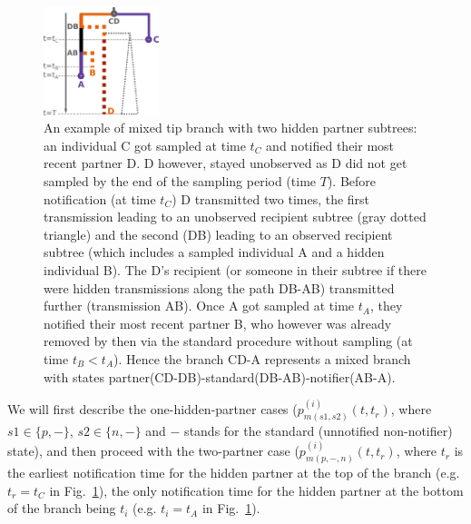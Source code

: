 \documentclass[a4paper,10pt]{article}
\begin{document}
\begin{figure}[tbhp]
\centering 
\includegraphics[width=0.3\textwidth]{Fig_mixed}
\caption{An example of mixed tip branch with two hidden partner subtrees: an individual C got sampled at time $t_C$ and notified their most recent partner D. D however, stayed unobserved as D did not get sampled by the end of the sampling period (time $T$). Before notification (at time $t_C$) D transmitted two times, the first transmission leading to an unobserved recipient subtree (gray dotted triangle) and the second (DB) leading to an observed recipient subtree (which includes a sampled individual A and a hidden individual B). The D's recipient (or someone in their subtree if there were hidden transmissions along the path DB-AB) transmitted further (transmission AB). Once A got sampled at time $t_A$, they notified their most recent partner B, who however was already removed by then via the standard procedure without sampling (at time $t_B < t_A$). Hence the branch CD-A represents a mixed branch with states partner(CD-DB)-standard(DB-AB)-notifier(AB-A). }
\label{fig:pn-mixed} 
\end{figure}


We will first describe the one-hidden-partner cases ($p_{m(s1,s2)}^{(i)}(t,t_r)$, where $s1 \in \{p, -\}$, $s2 \in \{n, -\}$ and $-$ stands for the standard (unnotified non-notifier) state), and then proceed with the two-partner case ($p_{m(p,-,n)}^{(i)}(t,t_{r})$, where $t_{r}$ is the earliest notification time for the hidden partner at the top of the branch (e.g. $t_r=t_C$ in Fig.~\ref{fig:pn-mixed}), the only notification time for the hidden partner at the bottom of the branch being $t_i$  (e.g. $t_i=t_A$ in Fig.~\ref{fig:pn-mixed}).
\end{document}
